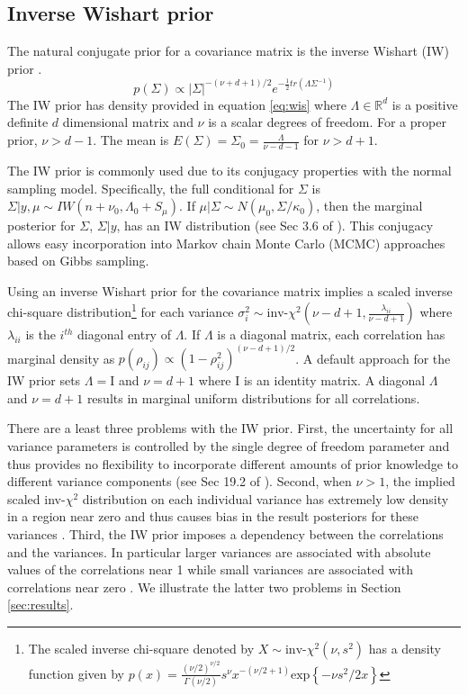 \documentclass[12pt]{article}
\newcommand{\I}{\mathrm{I}}
\begin{document}
\subsection{Inverse Wishart prior \label{sec:iw}}

The natural conjugate prior for a covariance matrix is the inverse Wishart (IW) prior \citep{barnard2000}. 
\begin{equation} 
p(\Sigma) \propto  |\Sigma|^{-(\nu+ d +1)/2 } e^{-\frac{1}{2} tr( \Lambda \Sigma^{-1}) }
\label{eq:wis}
\end{equation}
The IW prior has density provided in equation \eqref{eq:wis} where $\Lambda\in \mathbb{R}^d$ is a positive definite $d$ dimensional matrix and $\nu$ is a scalar degrees of freedom. For a proper prior, $\nu>d-1$. The mean is $E(\Sigma) = \Sigma_0= \frac{\Lambda}{\nu - d - 1}$ for $\nu>d+1$. 

The IW prior is commonly used due to its conjugacy properties with the normal sampling model. Specifically, the full conditional for $\Sigma$ is $\Sigma \vert y,\mu \sim IW(n+\nu_0, \Lambda_0+S_\mu)$. If $\mu|\Sigma \sim N(\mu_0,\Sigma/\kappa_0)$, then the marginal posterior for $\Sigma$, $\Sigma|y$, has an IW distribution (see Sec 3.6 of \cite{bda2013}). This conjugacy allows easy incorporation into Markov chain Monte Carlo (MCMC) approaches based on Gibbs sampling.

Using an inverse Wishart prior for the covariance matrix implies a scaled inverse chi-square distribution\footnote{The scaled inverse chi-square denoted by $X \sim \mbox{inv-}\chi^2(\nu, s^2)$ has a density function given by $p(x) =  \frac{(\nu/2)^{\nu/2}} {\Gamma(\nu/2)} s^{\nu}x^{-(\nu/2 + 1)} \mbox{exp}\left\{-\nu s^2 / 2x\right\} $} for each variance $\sigma_i^2\sim \mbox{inv-}\chi^2(\nu - d + 1, \frac{\lambda_{ii}}{\nu-d+1} )$ where $\lambda_{ii}$ is the $i^{th}$ diagonal entry of $\Lambda$. If $\Lambda$ is a diagonal matrix, each correlation has marginal density as $p(\rho_{ij}) \propto (1 - \rho_{ij}^2)^{(\nu - d + 1)/2}$. A default approach for the IW prior sets $\Lambda=\I$ and $\nu=d+1$ where $\I$ is an identity matrix. A diagonal $\Lambda$ and $\nu=d+1$ results in marginal uniform distributions for all correlations. 

There are a least three problems with the IW prior. First, the uncertainty for all variance parameters is controlled by the single degree of freedom parameter and thus provides no flexibility to incorporate different amounts of prior knowledge to different variance components (see Sec 19.2 of \cite{bda2003}). Second, when $\nu>1$, the implied scaled inv-$\chi^2$ distribution on each individual variance has extremely low density in a region near zero and thus causes bias in the result posteriors for these variances \citep{gelman2006prior}.  Third, the IW prior imposes a dependency between the correlations and the variances. In particular larger variances are associated with absolute values of the correlations near 1 while small variances are associated with correlations near zero \citep{visualize}.  We illustrate the latter two problems in Section \ref{sec:results}.
\end{document}
